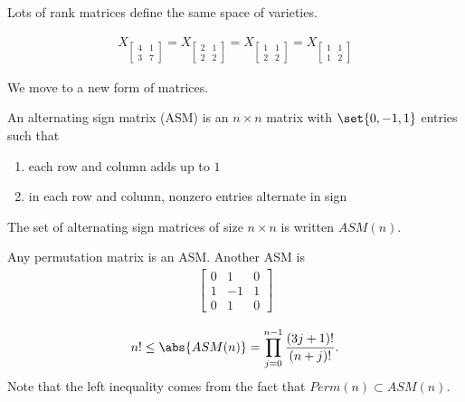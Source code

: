 \begin{remark}
    Lots of rank matrices define the same space of varieties.
\end{remark}
\begin{example}
    \begin{align*}
        X_{\left[\begin{smallmatrix} 4 & 1 \\ 3 & 7 \end{smallmatrix} \right]} = X_{\left[\begin{smallmatrix} 2 & 1 \\ 2 & 2 \end{smallmatrix} \right]} = X_{\left[\begin{smallmatrix} 1 & 1 \\ 2 & 2 \end{smallmatrix} \right]} = X_{\left[\begin{smallmatrix} 1 & 1 \\ 1 & 2 \end{smallmatrix} \right]}
    \end{align*}
\end{example}

We move to a new form of matrices.

\begin{definition}
    An alternating sign matrix (ASM) is an $n \times n$ matrix with $\set{ 0, -1, 1}$ entries such that
    \begin{enumerate}
        \item each row and column adds up to $1$
        \item in each row and column, nonzero entries alternate in sign
    \end{enumerate}
    The set of alternating sign matrices of size $n \times n$ is written $ASM(n)$.
\end{definition}

\begin{example} Any permutation matrix is an ASM. Another ASM is
\begin{align*}
    \begin{bmatrix}
        0 & 1 & 0 \\
        1 & -1 & 1 \\
        0 & 1 & 0
    \end{bmatrix}
\end{align*}
\end{example}

\begin{theorem}
    \begin{align*}
        n! \leq \abs{ASM(n)} = \prod_{j=0}^{n-1} \frac{(3j + 1 ) !}{ (n+j)!}.
    \end{align*}
    Note that the left inequality comes from the fact that $Perm(n) \subset ASM(n)$.
\end{theorem}

